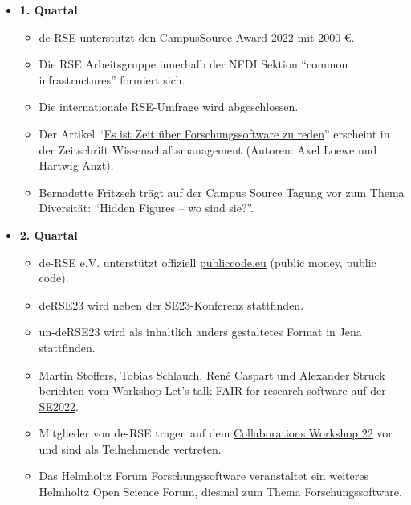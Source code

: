 \begin{itemize}
 \item \textbf{1. Quartal}
   \begin{itemize}
     \item de-RSE unterstützt den \href{https://ev.campussource.de/publikationen/csa2022/}{CampusSource Award 2022} mit 2000 €.
     \item Die RSE Arbeitsgruppe innerhalb der NFDI Sektion "`common infrastructures"' formiert sich.
     \item Die internationale RSE-Umfrage wird abgeschlossen.
     \item Der Artikel "`\href{https://www.wissenschaftsmanagement.de/news/es-ist-zeit-ueber-forschungssoftware-zu-reden}{Es ist Zeit über Forschungssoftware zu reden}"' erscheint in der Zeitschrift Wissenschaftsmanagement (Autoren: Axel Loewe und Hartwig Anzt).
     \item Bernadette Fritzsch trägt auf der Campus Source Tagung vor zum Thema Diversität: "`Hidden Figures – wo sind sie?"'.
   \end{itemize}
 \item \textbf{2. Quartal}
   \begin{itemize}
    \item de-RSE e.V. unterstützt offiziell \href{https://publiccode.eu}{publiccode.eu} (public money, public code).
    \item deRSE23 wird neben der SE23-Konferenz stattfinden.
    \item un-deRSE23 wird als inhaltlich anders gestaltetes Format in Jena stattfinden.
    \item Martin Stoffers, Tobias Schlauch, René Caspart und Alexander Struck berichten vom \href{https://de-rse.org/blog/2022/06/02/recap-workshop-lets-talk-fair-for-research-software-at-se2022.html}{Workshop Let's talk FAIR for research software auf der SE2022}.
    \item Mitglieder von de-RSE tragen auf dem \href{https://software.ac.uk/cw22/agenda}{Collaborations Workshop 22} vor und sind als Teilnehmende vertreten.
    \item Das Helmholtz Forum Forschungssoftware veranstaltet ein weiteres Helmholtz Open Science Forum, diesmal zum Thema Forschungssoftware.


\end{itemize}
\end{itemize}
